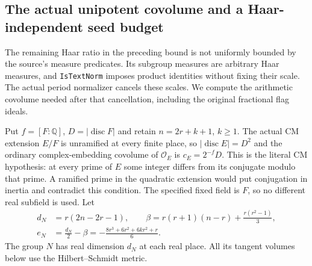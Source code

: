 \subsection{The actual unipotent covolume and a Haar-independent seed budget}
\label{global-gram-haar-budget}

The remaining Haar ratio in the preceding bound is not uniformly
bounded by the source's measure predicates.  Its subgroup measures
are arbitrary Haar measures, and \texttt{IsTextNorm} imposes product
identities without fixing their scale.  The actual period normalizer
cancels these scales.  We compute the arithmetic covolume needed
after that cancellation, including the original fractional flag
ideals.\cite{global-gram-haar-source}

Put $f=[F:\mathbb Q]$, $D=|\operatorname{disc}F|$ and retain
$n=2r+k+1$, $k\ge1$.  The actual CM extension $E/F$ is unramified
at every finite place, so $|\operatorname{disc}E|=D^2$ and the
ordinary complex-embedding covolume of $\mathcal O_E$ is
$c_E=2^{-f}D$.  This is the literal CM hypothesis: at every
prime of $E$ some integer differs from its conjugate modulo
that prime.  A ramified prime in the quadratic extension would
put conjugation in inertia and contradict this condition.
The specified fixed field is $F$, so no different real subfield
is used.  Let
\begin{equation}\label{global-gram-haar-exponents}
 \begin{aligned}
 d_N&=r(2n-2r-1),\qquad
 \beta=r(r+1)(n-r)+\frac{r(r^2-1)}3,\\
 e_N&=\frac{d_N}{2}-\beta
       =-\frac{8r^3+6r^2+6kr^2+r}{6}.
 \end{aligned}
\end{equation}
The group $N$ has real dimension $d_N$ at each real place.
All its tangent volumes below use the Hilbert--Schmidt metric.

